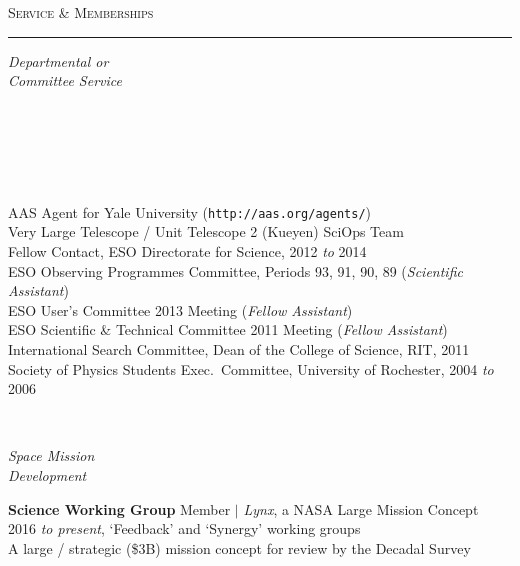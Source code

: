\documentclass[11pt]{article}
\makeatletter
\def\vhrulefill#1{\leavevmode\leaders\hrule\@height#1\hfill \kern\z@}
\makeatother
\begin{document}
\vspace{4mm}

\clearpage

\textsc{Service \& Memberships} \vhrulefill{0.4pt}



\vspace{4mm}


\hspace{2.5mm} \parbox{1.5in}{\textit{Departmental or \\Committee Service\\\\\\\\\\\\}} \parbox{5.15in}{
AAS Agent for Yale University ({\small \texttt{http://aas.org/agents/}})\\
Very Large Telescope / Unit Telescope 2 (Kueyen) SciOps Team \\
Fellow Contact, ESO Directorate for Science, 2012 \textit{to} 2014 \\
ESO Observing Programmes Committee, Periods 93, 91, 90, 89 (\textit{Scientific Assistant})\\
ESO User's Committee 2013 Meeting (\textit{Fellow Assistant})\\
ESO Scientific \& Technical Committee 2011 Meeting (\textit{Fellow Assistant})\\
International Search Committee, Dean of the College of Science, RIT, 2011 \\
Society of Physics Students Exec.~Committee, University of Rochester, 2004 \textit{to} 2006}\\

\vspace{4mm}

\hspace{2.5mm} \parbox{1.5in}{\textit{Space Mission \\ Development\\} } \parbox{5.15in}{
\textbf{Science Working Group} Member $|$ \textit{Lynx}, a NASA Large Mission Concept \\ 2016 \textit{to present},  `Feedback' and `Synergy' working groups \\ A large / strategic (\$3B) mission concept for review by the Decadal Survey } \\


\vspace{4mm}
\end{document}
